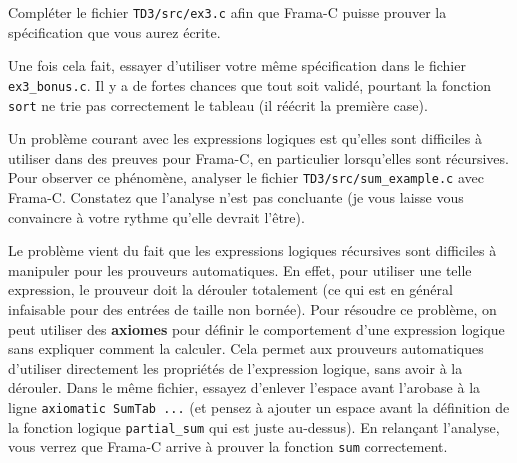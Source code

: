 \documentclass{article}
\begin{document}
\begin{Exercice}{}{}
    Compléter le fichier \texttt{TD3/src/ex3.c} afin que Frama-C puisse prouver
    la spécification que vous aurez écrite.
    

    \medskip

    Une fois cela fait, essayer d'utiliser votre même spécification dans le fichier
    \texttt{ex3\_bonus.c}.
    Il y a de fortes chances que tout soit validé, pourtant la fonction
    \texttt{sort} ne trie pas correctement le tableau (il réécrit la première case).
\end{Exercice}

\begin{Exercice}{}{}
    Un problème courant avec les expressions logiques est 
    qu'elles sont difficiles à utiliser dans des preuves pour Frama-C, 
    en particulier lorsqu'elles sont récursives.
    Pour observer ce phénomène, analyser le fichier \texttt{TD3/src/sum\_example.c}
    avec Frama-C.
    Constatez que l'analyse n'est pas concluante (je vous laisse vous convaincre
    à votre rythme qu'elle devrait l'être).

    \medskip

    Le problème vient du fait que les expressions logiques récursives
    sont difficiles à manipuler pour les prouveurs automatiques.
    En effet, pour utiliser une telle expression, le prouveur doit
    la dérouler totalement (ce qui est en général infaisable pour des entrées
    de taille non bornée).
    Pour résoudre ce problème, on peut utiliser des \textbf{axiomes} pour définir
    le comportement d'une expression logique sans expliquer
    comment la calculer.
    Cela permet aux prouveurs automatiques d'utiliser
    directement les propriétés de l'expression logique, sans avoir
    à la dérouler.
    Dans le même fichier, essayez d'enlever l'espace avant l'arobase
    à la ligne \texttt{axiomatic SumTab ...} (et pensez à ajouter un
    espace avant la définition de la fonction logique \texttt{partial\_sum}
    qui est juste au-dessus).
    En relançant l'analyse, vous verrez que Frama-C arrive à prouver la
    fonction \texttt{sum} correctement.

    \medskip


\end{Exercice}
\end{document}

